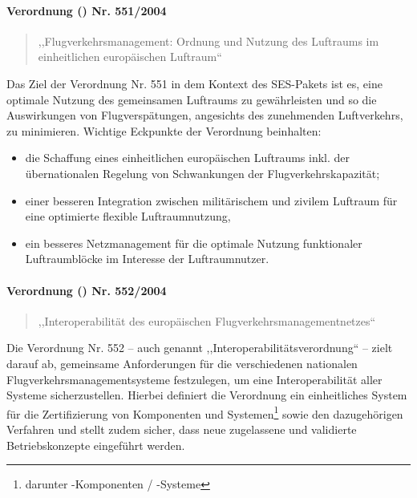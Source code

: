 \paragraph{Verordnung () Nr. 551/2004} \label{er_551}
    \begin{quote}
        ,,Flugverkehrsmanagement: Ordnung und Nutzung des Luftraums im einheitlichen europäischen Luftraum``
        \cite{2004R0551, 2004R0551_summary}
    \end{quote}

    \noindent
    Das Ziel der Verordnung Nr. 551 in dem Kontext des SES-Pakets ist es, eine optimale Nutzung des gemeinsamen Luftraums zu gewährleisten und so die Auswirkungen von Flugverspätungen, angesichts des zunehmenden Luftverkehrs, zu minimieren. 
    Wichtige Eckpunkte der Verordnung beinhalten: 
    
    \begin{itemize}
        \item die Schaffung eines einheitlichen europäischen Luftraums inkl. der übernationalen Regelung von Schwankungen der Flugverkehrskapazität;
        \item  einer besseren Integration zwischen militärischem und zivilem Luftraum für eine optimierte flexible Luftraumnutzung,
        \item ein besseres Netzmanagement für die optimale Nutzung funktionaler Luftraumblöcke im Interesse der Luftraumnutzer. \cite{2004R0551_summary}
    \end{itemize}

\paragraph{Verordnung () Nr. 552/2004} \label{er_552}
    \begin{quote}
        ,,Interoperabilität des europäischen Flugverkehrsmanagement\-netzes``
        \cite{2004R0552, 2004R0552_summary}
    \end{quote}
    
    \noindent
    Die Verordnung Nr. 552 -- auch genannt ,,Interoperabilitätsverordnung`` -- zielt darauf ab, gemeinsame Anforderungen für die verschiedenen nationalen Flugverkehrsmanagementsysteme festzulegen, um eine Interoperabilität aller Systeme sicherzustellen. \cite{2004R0552_summary}
    Hierbei definiert die Verordnung ein einheitliches System für die Zertifizierung von Komponenten und Systemen\footnote{darunter \atmans-Komponenten / -Systeme} sowie den dazugehörigen Verfahren und stellt zudem sicher, dass neue zugelassene und validierte Betriebskonzepte eingeführt werden. \cite[Art. 3 Abs. 1]{2004R0552}
    
